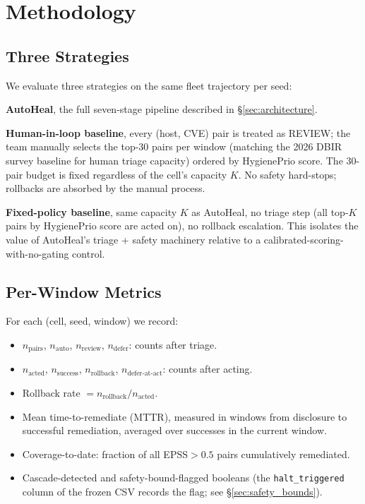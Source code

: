 \section{Methodology}

\subsection{Three Strategies}

We evaluate three strategies on the same fleet trajectory per seed:

\textbf{AutoHeal}, the full seven-stage pipeline described in
\S\ref{sec:architecture}.

\textbf{Human-in-loop baseline}, every (host, CVE) pair is treated
as REVIEW; the team manually selects the top-30 pairs per window
(matching the 2026 DBIR survey baseline for human triage capacity)
ordered by HygienePrio score. The 30-pair budget is fixed
regardless of the cell's capacity $K$. No safety hard-stops;
rollbacks are absorbed by the manual process.

\textbf{Fixed-policy baseline}, same capacity $K$ as AutoHeal, no
triage step (all top-$K$ pairs by HygienePrio score are acted on),
no rollback escalation. This isolates the value of AutoHeal's
triage + safety machinery relative to a calibrated-scoring-with-no-gating
control.

\subsection{Per-Window Metrics}

For each (cell, seed, window) we record:

\begin{itemize}
\item $n_{\text{pairs}}$, $n_{\text{auto}}$, $n_{\text{review}}$,
$n_{\text{defer}}$: counts after triage.
\item $n_{\text{acted}}$, $n_{\text{success}}$, $n_{\text{rollback}}$,
$n_{\text{defer-at-act}}$: counts after acting.
\item Rollback rate $= n_{\text{rollback}} / n_{\text{acted}}$.
\item Mean time-to-remediate (MTTR), measured in windows from
disclosure to successful remediation, averaged over successes in
the current window.
\item Coverage-to-date: fraction of all EPSS$>0.5$ pairs
cumulatively remediated.
\item Cascade-detected and safety-bound-flagged booleans (the
\texttt{halt\_triggered} column of the frozen CSV records the
flag; see \S\ref{sec:safety_bounds}).
\end{itemize}

